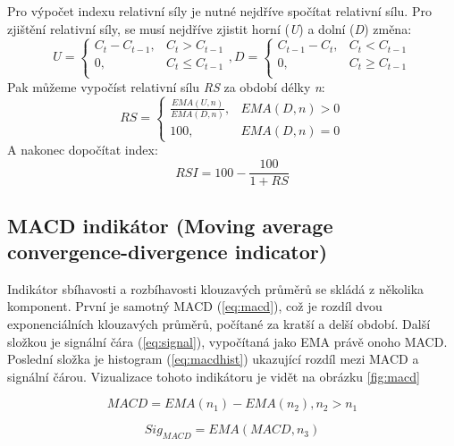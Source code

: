 Pro výpočet indexu relativní síly je nutné nejdříve spočítat relativní sílu. Pro zjištění relativní síly, se musí nejdříve zjistit horní (\emph{U}) a dolní (\emph{D}) změna:
\begin{equation}
    U = \begin{cases}
        C_t - C_{t - 1}, & C_t > C_{t - 1}   \\
        0,               & C_t \le C_{t - 1} \\
    \end{cases}
    ,
    D = \begin{cases}
        C_{t - 1} - C_t, & C_t < C_{t - 1}   \\
        0,               & C_t \ge C_{t - 1} \\
    \end{cases}
    \label{eq:du}
\end{equation}
Pak můžeme vypočíst relativní sílu \emph{RS} za období délky \emph{n}:
\begin{equation}
    RS =
    \begin{cases}
        \frac{EMA(U, n)}{EMA(D, n)}, & {EMA(D, n)} > 0 \\
        100,                         & {EMA(D, n)} = 0
    \end{cases}
    \label{eq:rs}
\end{equation}
A nakonec dopočítat index:
\begin{equation}
    RSI = 100 - \frac{100}{1 + RS}
    \label{eq:rsi}
\end{equation}

\subsection{MACD indikátor (Moving average convergence-divergence indicator)}
Indikátor sbíhavosti a rozbíhavosti klouzavých průměrů se skládá z několika komponent. První je samotný MACD (\ref{eq:macd}), což je rozdíl dvou exponenciálních klouzavých průměrů, počítané
za kratší a delší období. Další složkou je signální čára (\ref{eq:signal}), vypočítaná jako EMA právě onoho MACD. Poslední složka je histogram (\ref{eq:macdhist})
ukazující rozdíl mezi MACD a signální čárou. Vizualizace tohoto indikátoru je vidět na obrázku \ref{fig:macd}

\begin{equation}
    MACD = EMA(n_1) - EMA(n_2), n_2 > n_1
    \label{eq:macd}
\end{equation}

\begin{equation}
    Sig_{MACD} = EMA(MACD, n_3)
    \label{eq:signal}
\end{equation}

